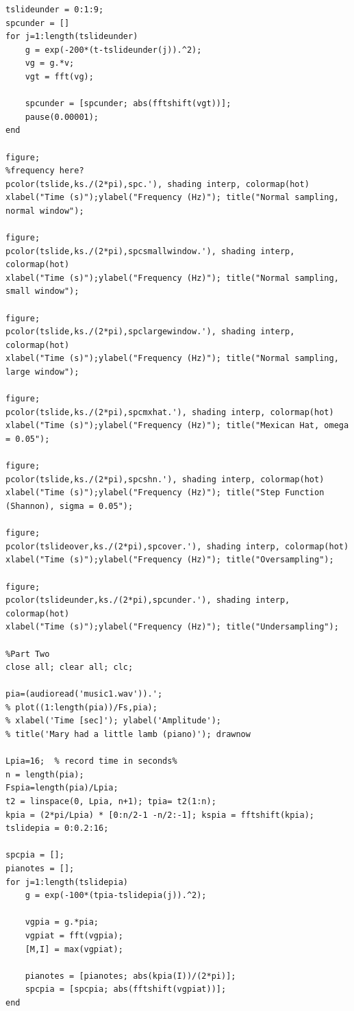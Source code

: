 \documentclass{article}
\begin{document}
\begin{lstlisting}[style=Matlab-editor]
tslideunder = 0:1:9;
spcunder = []
for j=1:length(tslideunder)
    g = exp(-200*(t-tslideunder(j)).^2);
    vg = g.*v;
    vgt = fft(vg);
    
    spcunder = [spcunder; abs(fftshift(vgt))];
    pause(0.00001);
end

figure;
%frequency here?
pcolor(tslide,ks./(2*pi),spc.'), shading interp, colormap(hot)
xlabel("Time (s)");ylabel("Frequency (Hz)"); title("Normal sampling, normal window");

figure;
pcolor(tslide,ks./(2*pi),spcsmallwindow.'), shading interp, colormap(hot)
xlabel("Time (s)");ylabel("Frequency (Hz)"); title("Normal sampling, small window");

figure;
pcolor(tslide,ks./(2*pi),spclargewindow.'), shading interp, colormap(hot)
xlabel("Time (s)");ylabel("Frequency (Hz)"); title("Normal sampling, large window");

figure;
pcolor(tslide,ks./(2*pi),spcmxhat.'), shading interp, colormap(hot)
xlabel("Time (s)");ylabel("Frequency (Hz)"); title("Mexican Hat, omega = 0.05");

figure;
pcolor(tslide,ks./(2*pi),spcshn.'), shading interp, colormap(hot)
xlabel("Time (s)");ylabel("Frequency (Hz)"); title("Step Function (Shannon), sigma = 0.05");

figure;
pcolor(tslideover,ks./(2*pi),spcover.'), shading interp, colormap(hot)
xlabel("Time (s)");ylabel("Frequency (Hz)"); title("Oversampling");

figure;
pcolor(tslideunder,ks./(2*pi),spcunder.'), shading interp, colormap(hot)
xlabel("Time (s)");ylabel("Frequency (Hz)"); title("Undersampling");

%Part Two
close all; clear all; clc;

pia=(audioread('music1.wav')).'; 
% plot((1:length(pia))/Fs,pia);
% xlabel('Time [sec]'); ylabel('Amplitude');
% title('Mary had a little lamb (piano)'); drawnow

Lpia=16;  % record time in seconds%
n = length(pia);
Fspia=length(pia)/Lpia;
t2 = linspace(0, Lpia, n+1); tpia= t2(1:n);
kpia = (2*pi/Lpia) * [0:n/2-1 -n/2:-1]; kspia = fftshift(kpia); 
tslidepia = 0:0.2:16;

spcpia = [];
pianotes = [];
for j=1:length(tslidepia)
    g = exp(-100*(tpia-tslidepia(j)).^2);
    
    vgpia = g.*pia;
    vgpiat = fft(vgpia);
    [M,I] = max(vgpiat);
    
    pianotes = [pianotes; abs(kpia(I))/(2*pi)];
    spcpia = [spcpia; abs(fftshift(vgpiat))];
end


\end{lstlisting}
\end{document}
